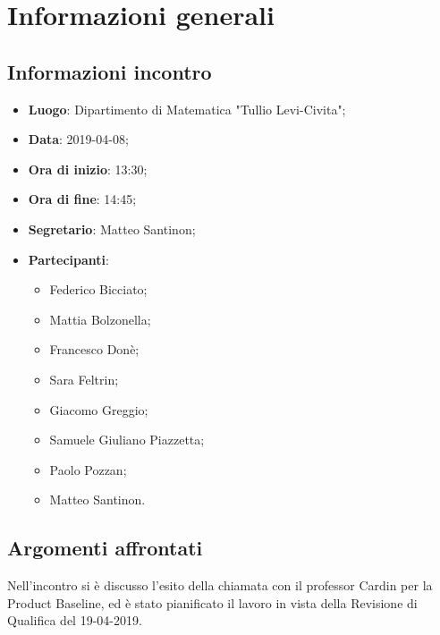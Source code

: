 \section{Informazioni generali}

\subsection{Informazioni incontro}
\begin{itemize}
\item \textbf{Luogo}: Dipartimento di Matematica "Tullio Levi-Civita";
\item \textbf{Data}: 2019-04-08;
\item \textbf{Ora di inizio}: 13:30;
\item \textbf{Ora di fine}: 14:45;
\item \textbf{Segretario}: Matteo Santinon;
\item \textbf{Partecipanti}: 
\begin{itemize}
	\item Federico Bicciato;
	\item Mattia Bolzonella;
	\item Francesco Donè;
	\item Sara Feltrin;
	\item Giacomo Greggio;
	\item Samuele Giuliano Piazzetta;
	\item Paolo Pozzan;
	\item Matteo Santinon.
\end{itemize}
\end{itemize}

\subsection{Argomenti affrontati}
Nell'incontro si è discusso l'esito della chiamata con il professor Cardin 
per la Product Baseline\glo, ed è stato pianificato il lavoro in vista della 
Revisione di Qualifica del 19-04-2019.
